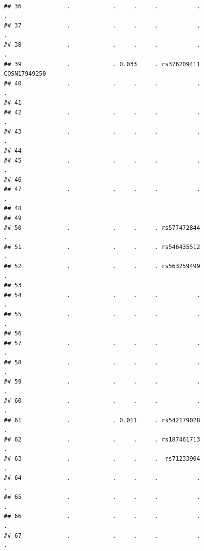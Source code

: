 \documentclass[
]{article}
\begin{document}
\begin{verbatim}
## 36             .            .     .     .           .                        .
## 37             .            .     .     .           .                        .
## 38             .            .     .     .           .                        .
## 39             .            . 0.033     . rs376209411             COSN17949250
## 40             .            .     .     .           .                        .
## 41                                                                            
## 42             .            .     .     .           .                        .
## 43             .            .     .     .           .                        .
## 44                                                                            
## 45             .            .     .     .           .                        .
## 46                                                                            
## 47             .            .     .     .           .                        .
## 48                                                                            
## 49                                                                            
## 50             .            .     .     . rs577472844                        .
## 51             .            .     .     . rs546435512                        .
## 52             .            .     .     . rs563259499                        .
## 53                                                                            
## 54             .            .     .     .           .                        .
## 55             .            .     .     .           .                        .
## 56                                                                            
## 57             .            .     .     .           .                        .
## 58             .            .     .     .           .                        .
## 59             .            .     .     .           .                        .
## 60             .            .     .     .           .                        .
## 61             .            . 0.011     . rs542179028                        .
## 62             .            .     .     . rs187461713                        .
## 63             .            .     .     .  rs71233904                        .
## 64             .            .     .     .           .                        .
## 65             .            .     .     .           .                        .
## 66             .            .     .     .           .                        .
## 67             .            .     .     .           .                        .

\end{verbatim}
\end{document}
